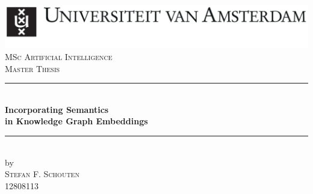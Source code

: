 
\begin{titlepage}

\newcommand{\HRule}{\rule{\linewidth}{0.5mm}} %

\center %

 

\includegraphics[width=\linewidth]{uva_logo.jpg}\\[2.5cm]

\textsc{\Large MSc Artificial Intelligence}\\[0.2cm]

\textsc{\Large Master Thesis}\\[0.5cm] 



\HRule \\[0.4cm]

{ \huge \bfseries {Incorporating Semantics\\ in Knowledge Graph Embeddings} }\\[0.4cm] 
\HRule \\[0.5cm]

 

by\\[0.2cm]

\textsc{\Large Stefan F. Schouten}\\[0.2cm] %

{12808113}\\[1cm]



\end{titlepage}
